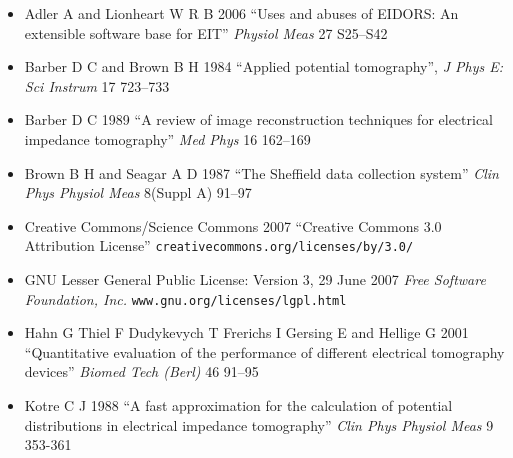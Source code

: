 \documentclass[letterpaper,twocolumn,11pt]{article}
\begin{document}
\begin{itemize}
\item[]
Adler A and Lionheart W R B 2006
``Uses and abuses of EIDORS: An extensible software base for EIT''
{\em Physiol Meas}
27 S25--S42

\item[]
Barber D C and Brown B H 1984
``Applied potential tomography'', 
{\em J Phys E: Sci Instrum}
 17 723--733

\item[]
Barber D C 1989
``A review of image reconstruction techniques for electrical
 impedance tomography''
{\em Med Phys}
16 162--169

\item[]
Brown B H and Seagar A D 1987 
``The Sheffield data collection system''
{\em Clin Phys Physiol Meas}
 8(Suppl A) 91--97

\item[]
Creative Commons/Science Commons 2007
``Creative Commons 3.0 Attribution License''
\verb+creativecommons.org/licenses/by/3.0/+

\item[]
GNU Lesser General Public License: Version 3, 29 June 2007
{\em Free Software Foundation, Inc.}
\verb+www.gnu.org/licenses/lgpl.html+

\item[]
Hahn G Thiel F Dudykevych T Frerichs I Gersing E
and Hellige G 2001
``Quantitative evaluation of the performance of
different electrical tomography devices''
{\em  Biomed Tech (Berl)}
46 91--95


\item[]
Kotre C J 1988
``A fast approximation for the calculation of potential distributions in electrical impedance tomography''
{\em Clin Phys Physiol Meas}
9 353-361
\end{itemize}
\end{document}
